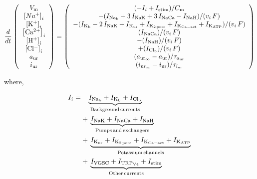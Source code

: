 \begin{equation}
  \frac{d}{dt}
  \left(
    \begin{array}{c}
      V_{\rm m}\\
      \left[Na^{+}\right]_{i}\\
      \left[\rm K^{+}\right]_{i}\\
      \left[\rm Ca^{2+}\right]_{i}\\
      \left[\rm H^{+}\right]_{i}\\
      \left[\rm Cl^{-}\right]_{i}\\
      a_{\rm ur}\\
      i_{\rm ur}\\
    \end{array}
  \right)  = \left(
    \begin{array}{c}
        (-I_{i} + I_{\rm stim})/{C_{\rm m}}\\
      - (I_{\rm Na_{b}} + 3\, I_{\rm NaK} + 3\, I_{\rm NaCa} - I_{\rm
        NaH})/(v_{i}\, F)\\
      - (I_{\rm K_{b}} - 2\, I_{\rm NaK} + I_{\rm K_{ur}} + I_{\rm
        K_{2\, pore}} + I_{\rm K_{Ca-act}} + I_{\rm K_{ATP}})/(v_{i}\,
      F)\\
        (I_{\rm NaCa})/(v_{i}\, F)\\
      - (I_{\rm NaH})/(v_{i}\, F)\\
      + (I_{\rm Cl_{b}})/(v_{i}\, F)\\
      (a_{{\rm ur}_{\infty}} - a_{\rm ur})/\tau_{a_{\rm ur}}\\
      (i_{{\rm ur}_{\infty}} - i_{\rm ur})/\tau_{i_{\rm ur}}\\
    \end{array}
  \right)
  \label{ode-system}
\end{equation}

\noindent where,

\begin{equation*}
    \begin{split}
      I_{i} =
      & \phantom{+\,} \underbrace{I_{\rm Na_b} + I_{\rm K_b} + I_{\rm Cl_b}}_{\rm
        Background\, currents}\\
      & +\, \underbrace{I_{\rm NaK} + I_{\rm NaCa} + I_{\rm NaH}}_{\rm
        Pumps\, and\, exchangers}\\
      & +\, \underbrace{I_{\rm K_{ur}} + I_{\rm K_{2\, pore}} + I_{\rm
          K_{Ca-act}} + I_{\rm K_{ATP}}}_{\rm Potassium\, channels}\\
      & +\, \underbrace{I_{\rm VGSC} + I_{\rm TRP_{V4}} + I_{\rm
          stim}}_{\rm Other\, currents}
    \end{split}
\end{equation*}

